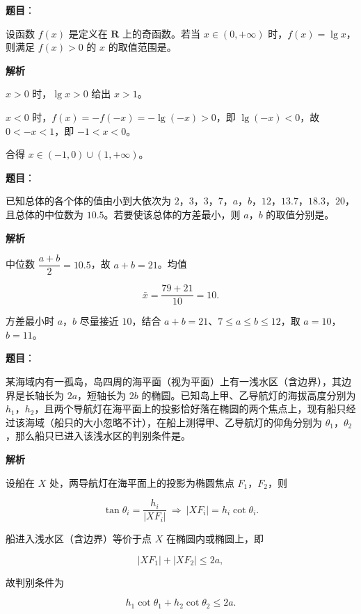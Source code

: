 \begin{answer}

\textbf{题目}：

设函数 $f(x)$ 是定义在 $\mathbf R$ 上的奇函数。若当 $x\in(0,+\infty)$ 时，$f(x)=\lg x$，则满足 $f(x)>0$ 的 $x$ 的取值范围是\gkblank{}。

\textbf{解析}

$x>0$ 时，$\lg x>0$ 给出 $x>1$。

$x<0$ 时，$f(x)=-f(-x)=-\lg(-x)>0$，即 $\lg(-x)<0$，故 $0<-x<1$，即 $-1<x<0$。

合得 $x\in(-1,0)\cup(1,+\infty)$。


\end{answer}
\begin{answer}

\textbf{题目}：

已知总体的各个体的值由小到大依次为 $2$，$3$，$3$，$7$，$a$，$b$，$12$，$13.7$，$18.3$，$20$，且总体的中位数为 $10.5$。若要使该总体的方差最小，则 $a$，$b$ 的取值分别是\gkblank{}。

\textbf{解析}

中位数 $\dfrac{a+b}2=10.5$，故 $a+b=21$。均值

\nopagebreak[4]
\[\bar x=\frac{79+21}{10}=10.\]

方差最小时 $a$，$b$ 尽量接近 $10$，结合 $a+b=21$、$7\leqslant a\leqslant b\leqslant12$，取 $a=10$，$b=11$。


\end{answer}
\begin{answer}

\textbf{题目}：

某海域内有一孤岛，岛四周的海平面（视为平面）上有一浅水区（含边界），其边界是长轴长为 $2a$，短轴长为 $2b$ 的椭圆。已知岛上甲、乙导航灯的海拔高度分别为 $h_1$，$h_2$，且两个导航灯在海平面上的投影恰好落在椭圆的两个焦点上，现有船只经过该海域（船只的大小忽略不计），在船上测得甲、乙导航灯的仰角分别为 $\theta_1$，$\theta_2$，那么船只已进入该浅水区的判别条件是\gkblank{}。

\textbf{解析}

设船在 $X$ 处，两导航灯在海平面上的投影为椭圆焦点 $F_1$，$F_2$，则

\nopagebreak[4]
\[\tan\theta_i=\frac{h_i}{|XF_i|}\ \Longrightarrow\ |XF_i|=h_i\cot\theta_i.\]

船进入浅水区（含边界）等价于点 $X$ 在椭圆内或椭圆上，即

\nopagebreak[4]
\[|XF_1|+|XF_2|\leqslant2a,\]

故判别条件为

\nopagebreak[4]
\[h_1\cot\theta_1+h_2\cot\theta_2\leqslant2a.\]


\end{answer}
